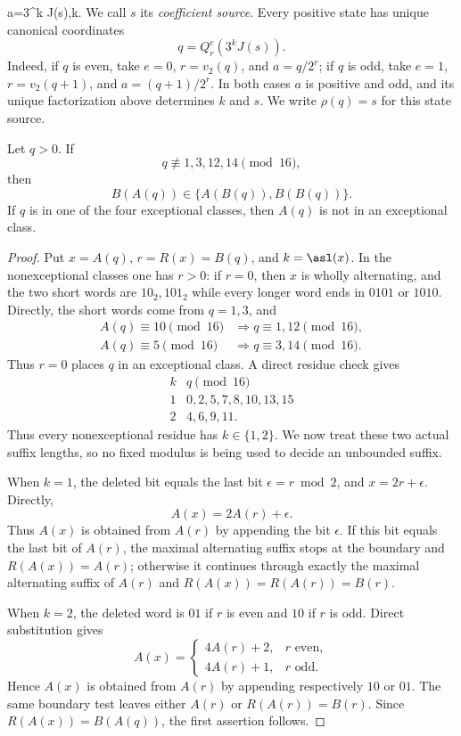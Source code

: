   a=3^k J(s),\qquad k.
\]
We call $s$ its \emph{coefficient source}.  Every positive state has unique
canonical coordinates
\[
 q=Q_r^e(3^k J(s)).
\]
Indeed, if $q$ is even, take $e=0$, $r=v_2(q)$, and $a=q/2^r$; if $q$ is
odd, take $e=1$, $r=v_2(q+1)$, and $a=(q+1)/2^r$.  In both cases $a$ is
positive and odd, and its unique factorization above determines $k$ and
$s$.  We write $\rho(q)=s$ for this state source.

\begin{lemma}\label{lem:ordinary-side}
Let $q>0$.  If
\[
 q\not\equiv1,3,12,14\pmod {16},
\]
then
\[
 B(A(q))\in\{A(B(q)),B(B(q))\}.
\]
If $q$ is in one of the four exceptional classes, then $A(q)$ is not in an
exceptional class.
\end{lemma}

\begin{proof}
Put $x=A(q)$, $r=R(x)=B(q)$, and $k=\asl(x)$.  In the
nonexceptional classes one has $r>0$: if $r=0$, then $x$ is wholly
alternating, and the two short words are $10_2,101_2$ while every longer
word ends in $0101$ or $1010$.  Directly, the short words come from
$q=1,3$, and
\[
\begin{aligned}
 A(q)\equiv10\pmod {16}&\Longrightarrow q\equiv1,12\pmod {16},\\
 A(q)\equiv5\pmod {16}&\Longrightarrow q\equiv3,14\pmod {16}.
\end{aligned}
\]
Thus $r=0$ places $q$ in an exceptional class.  A direct residue check gives
\[
\begin{array}{c|c}
 k& q\pmod {16}\\ \hline
 1&0,2,5,7,8,10,13,15\\
 2&4,6,9,11.
\end{array}
\]
Thus every nonexceptional residue has $k\in\{1,2\}$.  We now treat these
two actual suffix lengths, so no fixed modulus is being used to decide an
unbounded suffix.

When $k=1$, the deleted bit equals the last bit
$\epsilon=r\bmod2$, and $x=2r+\epsilon$.  Directly,
\[
 A(x)=2A(r)+\epsilon.
\]
Thus $A(x)$ is obtained from $A(r)$ by appending the bit $\epsilon$.
If this bit equals the last bit of $A(r)$, the maximal alternating suffix
stops at the boundary and $R(A(x))=A(r)$; otherwise it continues through
exactly the maximal alternating suffix of $A(r)$ and
$R(A(x))=R(A(r))=B(r)$.

When $k=2$, the deleted word is $01$ if $r$ is even and $10$ if $r$ is
odd.  Direct substitution gives
\[
 A(x)=
 \begin{cases}
  4A(r)+2,&r\text{ even},\\
  4A(r)+1,&r\text{ odd}.
 \end{cases}
\]
Hence $A(x)$ is obtained from $A(r)$ by appending respectively $10$ or
$01$.  The same boundary test leaves either $A(r)$ or
$R(A(r))=B(r)$.  Since $R(A(x))=B(A(q))$, the first assertion follows.


\end{proof}
